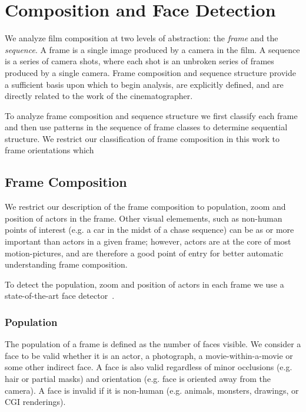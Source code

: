 \section*{Composition and Face Detection}

We analyze film composition at two levels of abstraction: the \emph{frame} and the \emph{sequence}.  A frame is a single image produced by a camera in the film.  A sequence is a series of camera shots, where each shot is an unbroken series of frames produced by a single camera.  Frame composition and sequence structure provide a sufficient basis upon which to begin analysis, are explicitly defined, and are directly related to the work of the cinematographer.

To analyze frame composition and sequence structure we first classify each frame and then use patterns in the sequence of frame classes to determine sequential structure.  We restrict our classification of frame composition in this work to frame orientations which 

\subsection{Frame Composition}

We restrict our description of the frame composition to population, zoom
and position of actors in the frame. Other visual elemements, such as
non-human points of interest (e.g. a car in the midst of
a chase sequence) can be as or more important than actors in a given frame;
 however, actors are at the core of most motion-pictures, and are therefore a good point of
 entry for better automatic understanding frame composition.

To detect the population, zoom and position of actors in each frame we 
use a state-of-the-art face detector~\cite{?}.  

\subsubsection{Population}
The population of a frame is defined as the number of faces visible. We consider a face to be valid whether it is an actor, a photograph, a movie-within-a-movie or some other indirect face. A face is also valid regardless of minor occlusions (e.g. hair or partial masks) and orientation (e.g. face is oriented away from the camera). A face is invalid if it is non-human (e.g. animals, monsters, drawings, or CGI renderings). 


